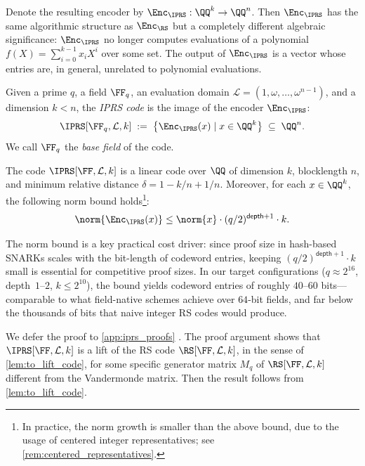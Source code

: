 Denote the resulting encoder by $\Enc_{\IPRS} : \QQ^k \to \QQ^n$. Then $\Enc_{\IPRS}$ has the same algorithmic structure as $\Enc_{\RS}$ but a completely different algebraic significance: $\Enc_{\IPRS}$ no longer computes evaluations of a polynomial $f(X) = \sum_{i=0}^{k-1} x_i X^i$ over some set. The  output of $\Enc_{\IPRS}$ is a vector whose entries are, in general, unrelated to polynomial evaluations.



\begin{definition}\label{def:to_iprs}
Given a prime $q$, a field $\FF_q$, an evaluation domain $\mathcal{L} = (1,\omega,\ldots,\omega^{n-1})$, and a dimension $k < n$, the \emph{IPRS code} is the image of the encoder $\Enc_{\IPRS}$:
%
\begin{equation}\label{eq:iprs_code}
\IPRS[\FF_q,\mathcal{L},k] \;:=\; \bigl\{ \Enc_{\IPRS}(x) \mid x \in \QQ^k \bigr\} \;\subseteq\; \QQ^n.
\end{equation}
We call $\FF_q$ the \emph{base field} of the code. 
\end{definition}


\begin{theorem}
\label{thm:iprs}
The code $\IPRS[\FF,\mathcal{L},k]$ is a linear code over $\QQ$  of dimension $k$, blocklength $n$, and minimum relative distance $\delta = 1 - k/n + 1/n$. Moreover, for each $x\in \QQ^k$, the following norm bound holds\footnote{In practice, the norm growth is smaller than the above bound, due to the usage of centered integer representatives; see \cref{rem:centered_representatives}.}:
%
$$
\norm{\Enc_{\IPRS}(x)} \leq \norm{x} \cdot (q/2)^{\mathsf{depth} +1} \cdot k.
$$
\end{theorem}
The norm bound is a key practical cost driver: since proof size in hash-based SNARKs scales with the bit-length of codeword entries, keeping $(q/2)^{\mathsf{depth}+1}\cdot k$ small is essential for competitive proof sizes. In our target configurations ($q\approx 2^{16}$, depth~$1$--$2$, $k\leq 2^{10}$), the bound yields codeword entries of roughly $40$--$60$ bits---comparable to what field-native schemes achieve over $64$-bit fields, and far below the thousands of bits that naive integer RS codes would produce.

We defer the proof to \cref{app:iprs_proofs} . The proof argument shows that $\IPRS[\FF,\mathcal{L},k]$ is a lift of the RS code $\RS[\FF,\mathcal{L},k]$, in the sense of \cref{lem:to_lift_code},  for some specific generator matrix $M_q$ of $\RS[\FF,\mathcal{L},k]$ different from the Vandermonde matrix. Then the result follows from  \cref{lem:to_lift_code}. 

